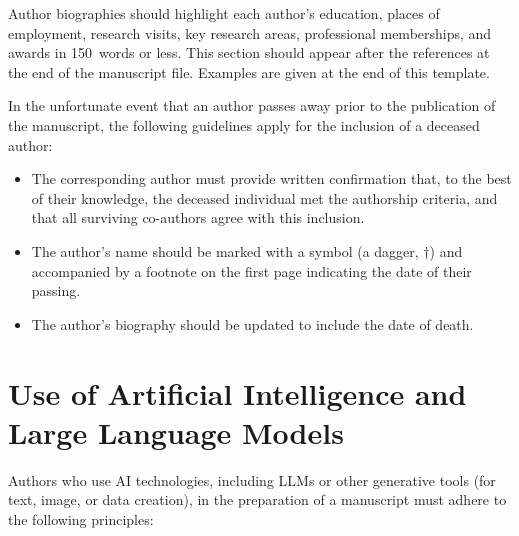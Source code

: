 \documentclass[fleqn,draft]{jaes}
\begin{document}
Author biographies should highlight each author’s education, places of employment, research visits, key research areas, professional memberships, and awards in 150~words or less. This section should appear after the references at the end of the manuscript file. Examples are given at the end of this template.

In the unfortunate event that an author passes away prior to the publication of the manuscript, the following guidelines apply for the inclusion of a deceased author:
\begin{itemize}
    \item The corresponding author must provide written confirmation that, to the best of their knowledge, the deceased individual met the authorship criteria, and that all surviving co-authors agree with this inclusion.
    \item The author's name should be marked with a symbol (a dagger, $\dagger$) and accompanied by a footnote on the first page indicating the date of their passing.
    \item The author’s biography should be updated to include the date of death.
\end{itemize}

\section{Use of Artificial Intelligence and Large Language Models}\label{sec:AI-LLM} 

Authors who use AI technologies, including LLMs or other generative tools (for text, image, or data creation), in the preparation of a manuscript must adhere to the following principles:
\end{document}
